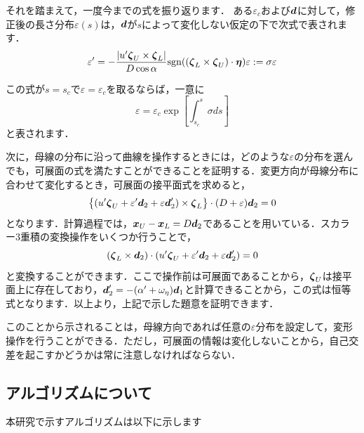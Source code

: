 \documentclass[16.7pt]{jsarticle}
\begin{document}
			それを踏まえて，一度今までの式を振り返ります．
			ある$ \varepsilon_c $および$ \boldsymbol{d} $に対して，修正後の長さ分布$ \varepsilon(s) $は，$ \boldsymbol{d} $が$ s $によって変化しない仮定の下で次式で表されます．
			\begin{equation}\label{eq:varDiffeq}
				\varepsilon' = -\frac{|u'\boldsymbol{\zeta}_U\times \boldsymbol{\zeta}_L|}{D \cos \alpha} \mathrm{sgn}((\boldsymbol{\zeta}_L \times \boldsymbol{\zeta}_U) \cdot \boldsymbol{\eta})\varepsilon := \sigma \varepsilon
			\end{equation}
			
			この式が$ s = s_c $で$ \varepsilon=\varepsilon_c $を取るならば，一意に
			\begin{equation}\label{eq:vareq}
				\varepsilon = \varepsilon_c \exp \left[ \int_{s_c}^{s} \sigma ds \right]
			\end{equation}
			と表されます．
			
			次に，母線の分布に沿って曲線を操作するときには，どのような$ \varepsilon $の分布を選んでも，可展面の式を満たすことができることを証明する．変更方向が母線分布に合わせて変化するとき，可展面の接平面式を求めると，
			\begin{equation}\label{eq:TanEq_withGene}
				\left\{ (u'\boldsymbol{\zeta}_U + \varepsilon' \boldsymbol{d}_2 + \varepsilon \boldsymbol{d}_2') \times \boldsymbol{\zeta}_L \right\}\cdot(D+\varepsilon)\boldsymbol{d}_2 = 0
			\end{equation}
			となります．計算過程では，$ \boldsymbol{x}_U - \boldsymbol{x}_L = D \boldsymbol{d}_2 $であることを用いている．スカラー3重積の変換操作をいくつか行うことで，
			\begin{equation}\label{eq:TanEq_ver2}
				(\boldsymbol{\zeta}_L \times \boldsymbol{d}_2 )\cdot (u'\boldsymbol{\zeta}_U + \varepsilon' \boldsymbol{d}_2 + \varepsilon \boldsymbol{d}_2') = 0
			\end{equation}
			と変換することができます．ここで操作前は可展面であることから，$ \boldsymbol{\zeta}_U $は接平面上に存在しており，$ \boldsymbol{d}_2' = -(\alpha' + \omega_{\eta}) \boldsymbol{d}_1 $と計算できることから，この式は恒等式となります．以上より，上記で示した題意を証明できます．
			
			このことから示されることは，母線方向であれば任意の$ \varepsilon $分布を設定して，変形操作を行うことができる．ただし，可展面の情報は変化しないことから，自己交差を起こすかどうかは常に注意しなければならない．
			
			
		\subsection{アルゴリズムについて}
		本研究で示すアルゴリズムは以下に示します
	
\end{document}
